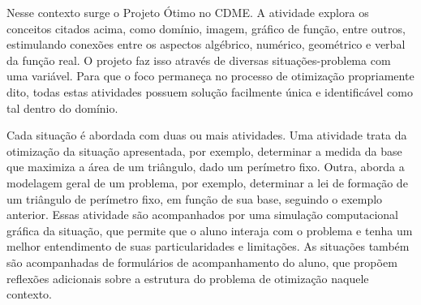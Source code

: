 Nesse contexto surge o Projeto Ótimo no CDME. A atividade explora os conceitos citados acima, como domínio, imagem, gráfico de função, entre outros, estimulando conexões entre os aspectos algébrico, numérico, geométrico e verbal da função real. O projeto faz isso através de diversas situações-problema com uma variável. Para que o foco permaneça no processo de otimização propriamente dito, todas estas atividades possuem solução facilmente única e identificável como tal dentro do domínio.

Cada situação é abordada com duas ou mais atividades. Uma atividade trata da otimização da situação apresentada, por exemplo, determinar a medida da base que maximiza a área de um triângulo, dado um perímetro fixo. Outra, aborda a modelagem geral de um problema, por exemplo, determinar a lei de formação de um triângulo de perímetro fixo, em função de sua base, seguindo o exemplo anterior. Essas atividade são acompanhados por uma simulação computacional gráfica da situação, que permite que o aluno interaja com o problema e tenha um melhor entendimento de suas particularidades e limitações. As situações também são acompanhadas de formulários de acompanhamento do aluno, que propõem reflexões adicionais sobre a estrutura do problema de otimização naquele contexto.

